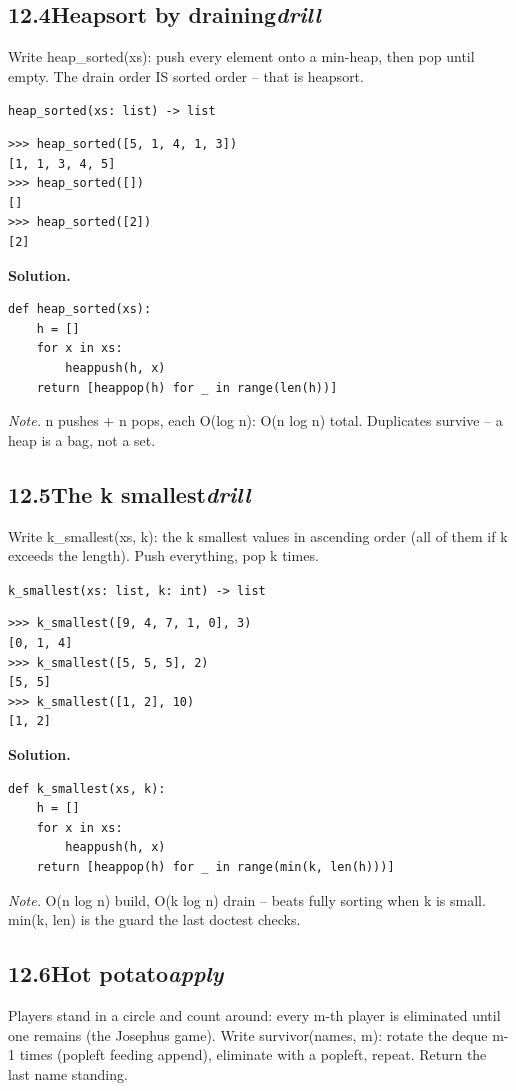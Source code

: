 \documentclass[10pt,letterpaper]{book}
\begin{document}
\subsection*{12.4\quad Heapsort by draining\hfill\textnormal{\textit{drill}}}
Write heap\_sorted(xs): push every element onto a min-heap, then pop until empty. The drain order IS sorted order -- that is heapsort.

\noindent\texttt{heap\_sorted(xs: list) -> list}
\begin{lstlisting}[style=ex]
>>> heap_sorted([5, 1, 4, 1, 3])
[1, 1, 3, 4, 5]
>>> heap_sorted([])
[]
>>> heap_sorted([2])
[2]
\end{lstlisting}
\noindent\textbf{Solution.}
\begin{lstlisting}[style=code]
def heap_sorted(xs):
    h = []
    for x in xs:
        heappush(h, x)
    return [heappop(h) for _ in range(len(h))]
\end{lstlisting}
\noindent\textit{Note.} n pushes + n pops, each O(log n): O(n log n) total. Duplicates survive -- a heap is a bag, not a set.

\subsection*{12.5\quad The k smallest\hfill\textnormal{\textit{drill}}}
Write k\_smallest(xs, k): the k smallest values in ascending order (all of them if k exceeds the length). Push everything, pop k times.

\noindent\texttt{k\_smallest(xs: list, k: int) -> list}
\begin{lstlisting}[style=ex]
>>> k_smallest([9, 4, 7, 1, 0], 3)
[0, 1, 4]
>>> k_smallest([5, 5, 5], 2)
[5, 5]
>>> k_smallest([1, 2], 10)
[1, 2]
\end{lstlisting}
\noindent\textbf{Solution.}
\begin{lstlisting}[style=code]
def k_smallest(xs, k):
    h = []
    for x in xs:
        heappush(h, x)
    return [heappop(h) for _ in range(min(k, len(h)))]
\end{lstlisting}
\noindent\textit{Note.} O(n log n) build, O(k log n) drain -- beats fully sorting when k is small. min(k, len) is the guard the last doctest checks.

\subsection*{12.6\quad Hot potato\hfill\textnormal{\textit{apply}}}
Players stand in a circle and count around: every m-th player is eliminated until one remains (the Josephus game). Write survivor(names, m): rotate the deque m-1 times (popleft feeding append), eliminate with a popleft, repeat. Return the last name standing.
\end{document}
